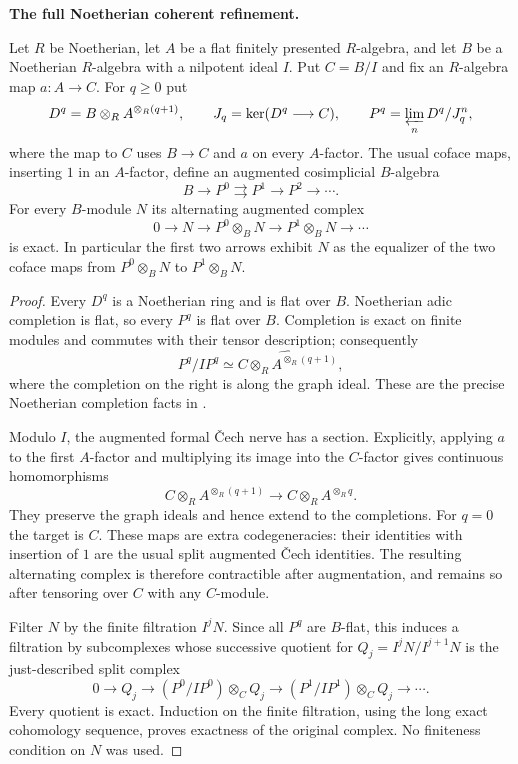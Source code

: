 \par\smallskip\noindent\textbf{The full Noetherian coherent refinement.}

\begin{lemma}\label{lem:DE-E2-completed-Cech}
Let $R$ be Noetherian, let $A$ be a flat finitely presented $R$-algebra, and let $B$ be a Noetherian $R$-algebra with a nilpotent ideal $I$.  Put $C=B/I$ and fix an $R$-algebra map $a:A\to C$.  For $q\geq0$ put
\[
 D^q=B\otimes_R A^{\otimes_R(q+1)},\qquad
 J_q=\ker(D^q\longrightarrow C),\qquad
 P^q=\varprojlim_n D^q/J_q^n,
\]
where the map to $C$ uses $B\to C$ and $a$ on every $A$-factor.  The usual coface maps, inserting $1$ in an $A$-factor, define an augmented cosimplicial $B$-algebra
\[
                    B\longrightarrow P^0\rightrightarrows P^1
                              \longrightarrow P^2\longrightarrow\cdots.
\]
For every $B$-module $N$ its alternating augmented complex
\[
 0\longrightarrow N\longrightarrow P^0\otimes_BN
       \longrightarrow P^1\otimes_BN\longrightarrow\cdots
\]
is exact.  In particular the first two arrows exhibit $N$ as the equalizer of the two coface maps from $P^0\otimes_BN$ to $P^1\otimes_BN$.
\end{lemma}
\begin{proof}
Every $D^q$ is a Noetherian ring and is flat over $B$.  Noetherian adic completion is flat, so every $P^q$ is flat over $B$.  Completion is exact on finite modules and commutes with their tensor description; consequently
\[
 P^q/IP^q\simeq
 \widehat{C\otimes_R A^{\otimes_R(q+1)}},
\]
where the completion on the right is along the graph ideal.  These are the precise Noetherian completion facts in \citet[Lemmas~10.97.1--6, especially Tags~00MA and~00MB]{StacksProject}.

Modulo $I$, the augmented formal \v{C}ech nerve has a section.  Explicitly, applying $a$ to the first $A$-factor and multiplying its image into the $C$-factor gives continuous homomorphisms
\[
 C\otimes_R A^{\otimes_R(q+1)}
       \longrightarrow C\otimes_R A^{\otimes_R q}.
\]
They preserve the graph ideals and hence extend to the completions.  For $q=0$ the target is $C$.  These maps are extra codegeneracies: their identities with insertion of $1$ are the usual split augmented \v{C}ech identities.  The resulting alternating complex is therefore contractible after augmentation, and remains so after tensoring over $C$ with any $C$-module.

Filter $N$ by the finite filtration $I^jN$.  Since all $P^q$ are $B$-flat, this induces a filtration by subcomplexes whose successive quotient for $Q_j=I^jN/I^{j+1}N$ is the just-described split complex
\[
 0\longrightarrow Q_j\longrightarrow
 (P^0/IP^0)\otimes_CQ_j\longrightarrow
 (P^1/IP^1)\otimes_CQ_j\longrightarrow\cdots.
\]
Every quotient is exact.  Induction on the finite filtration, using the long exact cohomology sequence, proves exactness of the original complex.  No finiteness condition on $N$ was used.
\end{proof}

